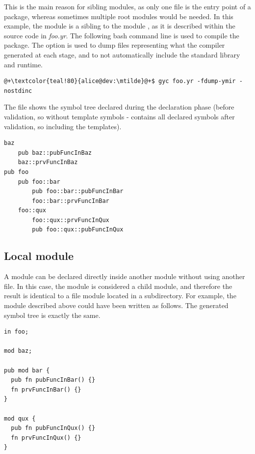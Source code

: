 This is the main reason for sibling modules, as only one file is the entry point
of a package, whereas sometimes multiple root modules would be needed. In this
example, the module  is a sibling to the module , as it is
described within the source code in \textit{foo.yr}. The following bash command
line is used to compile the package. The  option is used to
dump files representing what the compiler generated at each stage, and
 to not automatically include the standard library and runtime.

\begin{lstlisting}[style=bashVerb, escapechar=@+]
@+\textcolor{teal!80}{alice@dev:\mtilde}@+$ gyc foo.yr -fdump-ymir -nostdinc
\end{lstlisting}

The file  shows the symbol tree declared during the
declaration phase (before validation, so without template symbols -
 contains all declared symbols after validation, so
including the templates).

\begin{lstlisting}[style=bashVerb, escapechar=@+]
baz
    pub baz::pubFuncInBaz
    baz::prvFuncInBaz
pub foo
    pub foo::bar
        pub foo::bar::pubFuncInBar
        foo::bar::prvFuncInBar
    foo::qux
        foo::qux::prvFuncInQux
        pub foo::qux::pubFuncInQux
\end{lstlisting}

\subsection{Local module}

A module can be declared directly inside another module without using another
file. In this case, the module is considered a child module, and therefore the
result is identical to a file module located in a subdirectory. For example, the
 module described above could have been written as follows. The
generated symbol tree is exactly the same.

\begin{lstlisting}[caption=\textit{./foo.yr}, style=coloredverbatim]
in foo;

mod baz;

pub mod bar {
  pub fn pubFuncInBar() {}
  fn prvFuncInBar() {}
}

mod qux {
  pub fn pubFuncInQux() {}
  fn prvFuncInQux() {}
}
\end{lstlisting}

